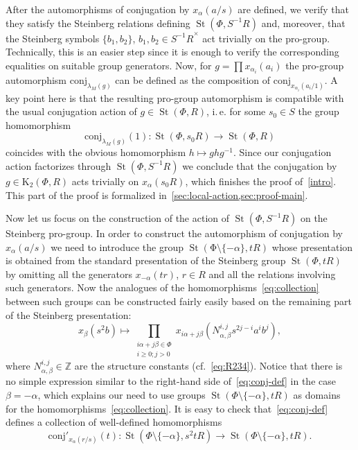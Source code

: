 \documentclass[oneside, 11pt]{amsart}
\numberwithin{equation}{section}
\theoremstyle{definition}
\theoremstyle{remark}
\DeclareMathOperator\St{St}
\begin{document}
After the automorphisms of conjugation by $x_\alpha(a/s)$ are defined, we verify that they satisfy the Steinberg relations defining $\St(\Phi, S^{-1}R)$ and, moreover, that the Steinberg symbols $\{b_1, b_2\}$, $b_1, b_2 \in {S^{-1}R}^\times$ act trivially on the pro-group. Technically, this is an easier step since it is enough to verify the corresponding equalities on suitable group generators.
Now, for $g = \prod x_{\alpha_i}(a_i)$ the pro-group automorphism $\mathrm{conj}_{\lambda_M(g)}$ can be defined as the composition of $\mathrm{conj}_{x_{\alpha_i}(a_i/1)}$.
A key point here is that the resulting pro-group automorphism is compatible with the usual conjugation action of $g \in \St(\Phi, R)$, i.\,e. for some $s_0 \in S$ the group homomorphism \[\mathrm{conj}_{\lambda_M(g)}(1) \colon \St(\Phi, s_0R) \to \St(\Phi, R)\] coincides with the obvious homomorphism $h \mapsto ghg^{-1}$. Since our conjugation action factorizes through $\St(\Phi, S^{-1}R)$ we conclude that the conjugation by $g \in \mathrm K_2(\Phi, R)$ acts trivially on $x_\alpha(s_0R)$, which finishes the proof of~\eqref{intro}. This part of the proof is formalized in~\cref{sec:local-action,sec:proof-main}.

Now let us focus on the construction of the action of $\St(\Phi, S^{-1}R)$ on the Steinberg pro-group. In order to construct the automorphism of conjugation by $x_{\alpha}(a/s)$ we need to introduce the group $\St(\mathrm \Phi\setminus\{-\alpha\}, tR)$ whose presentation is obtained from the standard presentation of the Steinberg group $\St(\Phi, tR)$ by omitting all the generators $x_{-\alpha}(tr)$, $r \in R$ and all the relations involving such generators. Now the analogues of the homomorphisms~\eqref{eq:collection} between such groups can be constructed fairly easily based on the remaining part of the Steinberg presentation:
\begin{equation} \label{eq:conj-def} x_\beta(s^2 b) \mapsto \prod_{\substack{i \alpha + j \beta \in \Phi\\ i \geq 0; j > 0}} x_{i\alpha + j\beta}(N_{\alpha, \beta}^{i, j} s^{2j - i} a^i b^j), \end{equation}
where \(N_{\alpha, \beta}^{i, j} \in \mathbb Z\) are the structure constants (cf.~\eqref{eq:R234}).
Notice that there is no simple expression similar to the right-hand side of~\eqref{eq:conj-def} in the case $\beta=-\alpha$, which explains our need to use groups $\St(\Phi\setminus\{-\alpha\}, tR)$ as domains for the homomorphisms~\eqref{eq:collection}.
It is easy to check that~\eqref{eq:conj-def} defines a collection of well-defined homomorphisms
\[\mathrm{conj}'_{x_\alpha(r/s)}(t)\colon \St(\Phi\setminus\{-\alpha\}, s^2 tR) \to \St(\Phi\setminus\{-\alpha\}, tR).\]
\end{document}
